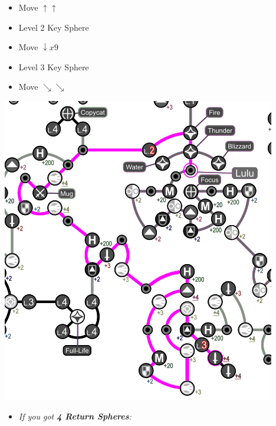 \begin{spheregrid}
    \begin{multicols}{2}
        \begin{itemize}
            \luluf
            \begin{itemize}
                \item Move $\uparrow\uparrow$
                \item Level 2 Key Sphere
                \item Move $\downarrow x9$
                \item Level 3 Key Sphere
                \item Move $\searrow\searrow$
            \end{itemize}
            \includegraphics[width=.75\columnwidth]{graphics/lulu_grid}
            \yunaf
            \begin{itemize}
                \item \textit{If you got \textbf{4 Return Spheres}:}
                \begin{itemize}
\end{itemize}
\end{itemize}
\end{itemize}
\end{multicols}
\end{spheregrid}
